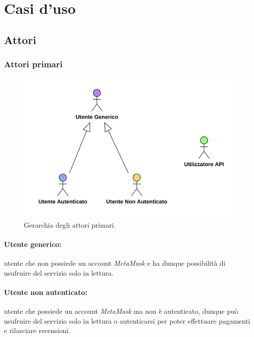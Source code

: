 \section{Casi d'uso}

    \subsection{Attori}

        \subsubsection{Attori primari}
            \begin{figure}[H]
                \centering
                \includegraphics[scale=0.4]{src/img/attori_primari.png}
                \caption{Gerarchia degli attori primari}
            \end{figure}

            \paragraph*{Utente generico:} utente che non possiede un account \textit{MetaMask} e ha dunque possibilità di usufruire del servizio solo in lettura.

            \paragraph*{Utente non autenticato:} utente che possiede un account \textit{MetaMask} ma non è autenticato, dunque può usufruire del servizio solo in lettura o autenticarsi per poter effettuare pagamenti e rilasciare recensioni.

